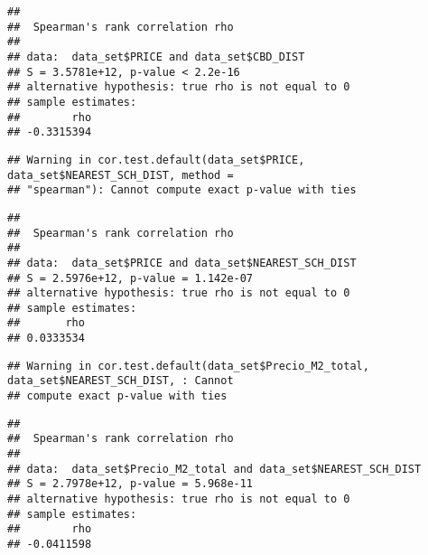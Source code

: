 \documentclass[
]{article}
\newenvironment{Shaded}{\begin{snugshade}}{\end{snugshade}}
\newcommand{\AttributeTok}[1]{\textcolor[rgb]{0.77,0.63,0.00}{#1}}
\newcommand{\FunctionTok}[1]{\textcolor[rgb]{0.00,0.00,0.00}{#1}}
\newcommand{\NormalTok}[1]{#1}
\newcommand{\SpecialCharTok}[1]{\textcolor[rgb]{0.00,0.00,0.00}{#1}}
\newcommand{\StringTok}[1]{\textcolor[rgb]{0.31,0.60,0.02}{#1}}
\begin{document}
\begin{verbatim}
## 
##  Spearman's rank correlation rho
## 
## data:  data_set$PRICE and data_set$CBD_DIST
## S = 3.5781e+12, p-value < 2.2e-16
## alternative hypothesis: true rho is not equal to 0
## sample estimates:
##        rho 
## -0.3315394
\end{verbatim}

\begin{Shaded}
\end{Shaded}

\begin{verbatim}
## Warning in cor.test.default(data_set$PRICE, data_set$NEAREST_SCH_DIST, method =
## "spearman"): Cannot compute exact p-value with ties
\end{verbatim}

\begin{verbatim}
## 
##  Spearman's rank correlation rho
## 
## data:  data_set$PRICE and data_set$NEAREST_SCH_DIST
## S = 2.5976e+12, p-value = 1.142e-07
## alternative hypothesis: true rho is not equal to 0
## sample estimates:
##       rho 
## 0.0333534
\end{verbatim}

\begin{Shaded}
\end{Shaded}

\begin{verbatim}
## Warning in cor.test.default(data_set$Precio_M2_total, data_set$NEAREST_SCH_DIST, : Cannot
## compute exact p-value with ties
\end{verbatim}

\begin{verbatim}
## 
##  Spearman's rank correlation rho
## 
## data:  data_set$Precio_M2_total and data_set$NEAREST_SCH_DIST
## S = 2.7978e+12, p-value = 5.968e-11
## alternative hypothesis: true rho is not equal to 0
## sample estimates:
##        rho 
## -0.0411598
\end{verbatim}
\end{document}
